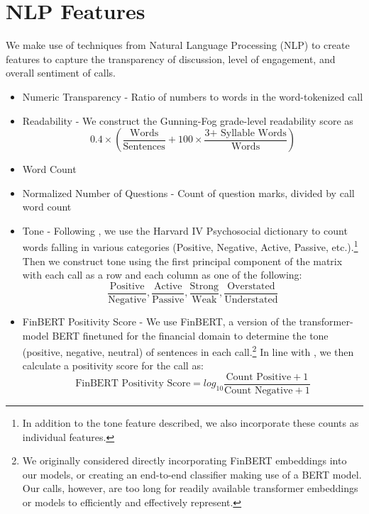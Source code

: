 \documentclass{article}[11pt]
\begin{document}
    \section*{NLP Features}

    We make use of techniques from Natural Language Processing (NLP) to create features to capture the transparency of discussion, level of engagement, and overall sentiment of calls.

    \begin{itemize}
        \item Numeric Transparency - Ratio of numbers to words in the word-tokenized call
        \item Readability - We construct the Gunning-Fog grade-level readability score \citep{gunning_technique_1952} as 
        \begin{equation*}
            0.4 \times (\frac{\text{Words}}{\text{Sentences}} + 100 \times \frac{\text{3+ Syllable Words}}{\text{Words}})
        \end{equation*}
        \item Word Count
        \item Normalized Number of Questions - Count of question marks, divided by call word count
        \item Tone - Following \cite{price_earnings_2012}, we use the Harvard IV Psychosocial dictionary to count words falling in various categories (Positive, Negative, Active, Passive, etc.).\footnote{In addition to the tone feature described, we also incorporate these counts as individual features.} Then we construct tone using the first principal component of the matrix with each call as a row and each column as one of the following:
        \begin{equation*}
            \frac{\text{Positive}}{\text{Negative}}, \frac{\text{Active}}{\text{Passive}}, \frac{\text{Strong}}{\text{Weak}}, \frac{\text{Overstated}}{\text{Understated}}
        \end{equation*}
        \item FinBERT Positivity Score - We use FinBERT, a version of the transformer-model BERT finetuned for the financial domain to determine the tone (positive, negative, neutral) of sentences in each call.\footnote{We originally considered directly incorporating FinBERT embeddings into our models, or creating an end-to-end classifier making use of a BERT model. Our calls, however, are too long for readily available transformer embeddings or models to efficiently and effectively represent.} \citep{huang_finbert_2023} In line with \cite{kantos_comparative_2022}, we then calculate a positivity score for the call as:
        \begin{equation*}
            \text{FinBERT Positivity Score} = log_{10}\frac{\text{Count Positive} + 1}{\text{Count Negative} + 1}
        \end{equation*}
    \end{itemize}
\end{document}
